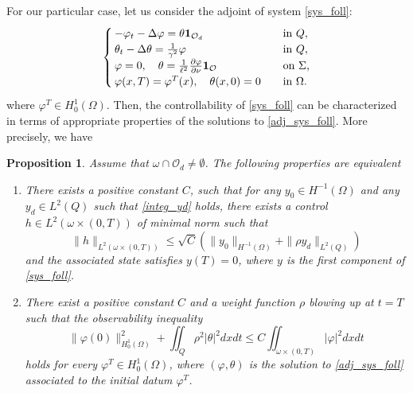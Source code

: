 \documentclass[preprint,10pt]{article}
\newtheorem{proposition}[theorem]{Proposition}
\numberwithin{equation}{section}
\numberwithin{theorem}{section}
\begin{document}
{For our particular case, let us consider the adjoint of system \eqref{sys_foll}:
%
\begin{equation}\label{adj_sys_foll}
\begin{cases}
-\varphi_t-\Delta \varphi= \theta\mathbf{1}_{\mathcal O_d} \quad&\textnormal{in }Q, \\
\theta_t-\Delta \theta=\frac{1}{\gamma^2}\varphi \quad& \textnormal{in }Q, \\
\varphi=0, \quad \theta=\frac{1}{\ell^2}\frac{\partial \varphi}{\partial \nu}\mathbf {1}_\mathcal O \quad &\textnormal{on $\Sigma$,} \\
\varphi(x,T)=\varphi^T(x), \quad \theta(x,0)=0 \quad &\textnormal{in $\Omega$}.
\end{cases}
\end{equation}
%
where $\varphi^T\in H^{1}_0(\Omega)$. Then, the controllability of \eqref{sys_foll} can be characterized in terms of appropriate properties of the solutions to \eqref{adj_sys_foll}. 
More precisely, we have

\begin{proposition}\label{prop_control}
Assume that $\omega\cap\mathcal O_d\neq \emptyset$. The following properties are equivalent
%
\begin{enumerate}
\item There exists a positive constant $C$, such that for any $y_0\in H^{-1}(\Omega)$ and any $y_d\in L^2(Q)$ such that \eqref{integ_yd} holds, there exists a control $h\in L^2(\omega\times(0,T))$ of minimal norm such that 
%
\begin{equation}
\|h\|_{L^2(\omega\times(0,T))}\leq \sqrt C\left(\|y_0\|_{H^{-1}(\Omega)}+\|\rho y_d\|_{L^2(Q)}\right)
\end{equation}
%
and the associated state satisfies $y(T)=0$, where $y$ is the first component of \eqref{sys_foll}.  
%
\item There exist a positive constant $C$ and a weight function $\rho$ blowing up at $t=T$ such that the observability inequality 
%
\begin{equation}\label{obs_ineq_1}
\|\varphi(0)\|_{H^1_{0}(\Omega)}^2+\iint_Q \rho^2|\theta|^2dxdt\leq C\iint_{\omega\times(0,T)}|\varphi|^2dxdt
\end{equation}
%
holds for every $\varphi^T\in H^1_{0}(\Omega)$, where $(\varphi,\theta)$ is the solution to \eqref{adj_sys_foll} associated to the initial datum $\varphi^T$. 
\end{enumerate}
%
\end{proposition}

}
\end{document}

